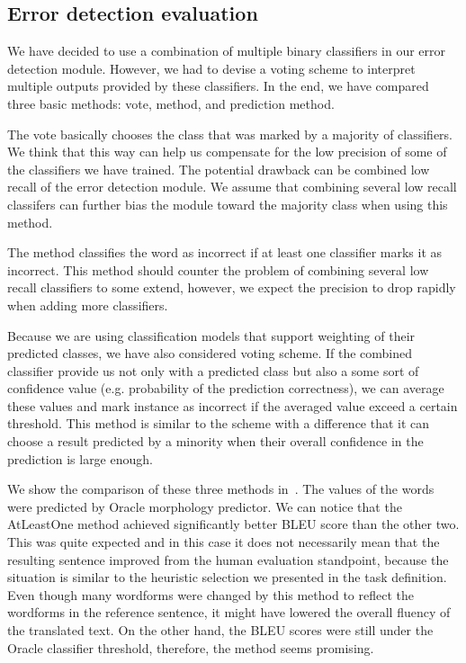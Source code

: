 \subsection{Error detection evaluation}

We have decided to use a combination of multiple binary classifiers in our error detection module.
However, we had to devise a voting scheme to interpret multiple outputs provided by these classifiers.
In the end, we have compared three basic methods:  vote,  method,
and  prediction method.

The  vote basically chooses the class that was marked by a majority of classifiers.
We think that this way can help us compensate for the low precision of some of the classifiers we have trained.
The potential drawback can be combined low recall of the error detection module. We assume that
combining several low recall classifers can further bias the module toward the majority class when using
this method.

The  method classifies the word as incorrect if at least one classifier marks it
as incorrect. This method should counter the problem of combining several low recall classifiers to some
extend, however, we expect the precision to drop rapidly when adding more classifiers.

Because we are using classification models that support weighting of their predicted classes, we have
also considered  voting scheme. If the combined classifier provide us not only with
a predicted class but also a some sort of confidence value (e.g. probability of the prediction correctness),
we can average these values and mark instance as incorrect if the averaged value exceed a certain threshold.
This method is similar to the  scheme with a difference that it can choose a result
predicted by a minority when their overall confidence in the prediction is large enough.

We show the comparison of these three methods in~. The values of the 
words were predicted by Oracle morphology predictor. We can notice that the AtLeastOne method achieved
significantly better BLEU score than the other two. This was quite expected and in this case it does
not necessarily mean that the resulting sentence improved from the human evaluation standpoint, because
the situation is similar to the heuristic selection we presented in the task definition. Even though
many wordforms were changed by this method to reflect the wordforms in the reference sentence, it
might have lowered the overall fluency of the translated text. On the other hand, the BLEU scores were
still under the Oracle classifier threshold, therefore, the method seems promising.

